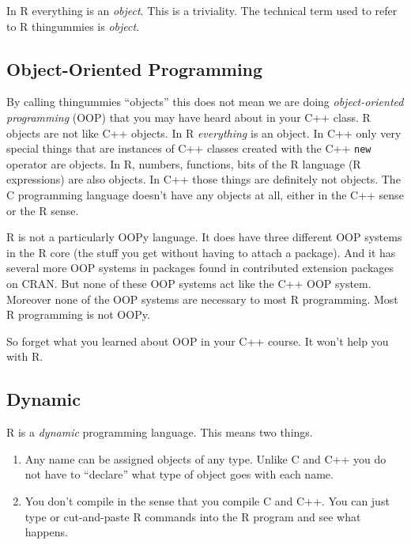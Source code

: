 \documentclass[
]{article}
\begin{document}
In R everything is an \emph{object}. This is a triviality. The technical
term used to refer to R thingummies is \emph{object}.

\hypertarget{object-oriented-programming}{%
\subsection{Object-Oriented
Programming}\label{object-oriented-programming}}

By calling thingummies ``objects'' this does not mean we are doing
\emph{object-oriented programming} (OOP) that you may have heard about
in your C++ class. R objects are not like C++ objects. In R
\emph{everything} is an object. In C++ only very special things that are
instances of C++ classes created with the C++ \texttt{new} operator are
objects. In R, numbers, functions, bits of the R language (R
expressions) are also objects. In C++ those things are definitely not
objects. The C programming language doesn't have any objects at all,
either in the C++ sense or the R sense.

R is not a particularly OOPy language. It does have three different OOP
systems in the R core (the stuff you get without having to attach a
package). And it has several more OOP systems in packages found in
contributed extension packages on CRAN. But none of these OOP systems
act like the C++ OOP system. Moreover none of the OOP systems are
necessary to most R programming. Most R programming is not OOPy.

So forget what you learned about OOP in your C++ course. It won't help
you with R.

\hypertarget{dynamic}{%
\subsection{Dynamic}\label{dynamic}}

R is a \emph{dynamic} programming language. This means two things.

\begin{enumerate}
\def\labelenumi{\arabic{enumi}.}
\item
  Any name can be assigned objects of any type. Unlike C and C++ you do
  not have to ``declare'' what type of object goes with each name.
\item
  You don't compile in the sense that you compile C and C++. You can
  just type or cut-and-paste R commands into the R program and see what
  happens.
\end{enumerate}
\end{document}
